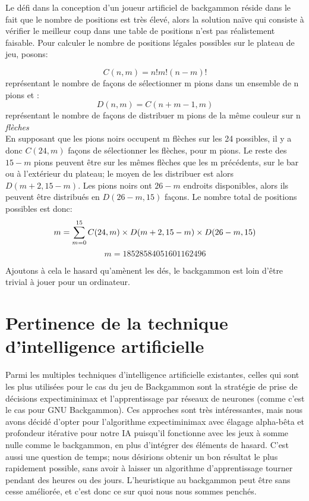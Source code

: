 \documentclass{article}
\begin{document}
Le défi dans la conception d’un joueur artificiel de backgammon réside dans le
fait que le nombre de positions est très élevé, alors la solution naïve qui
consiste à vérifier le meilleur coup dans une table de positions n’est pas
réalistement faisable. Pour calculer le nombre de positions légales possibles
sur le plateau de jeu, posons:


\begin{equation}
    C(n,m) = n!m!(n-m)!
\end{equation}
représentant le nombre de façons de sélectionner m pions dans un ensemble de n
pions et :
\begin{equation}
    D(n,m) = C(n+m-1,m)
\end{equation}
représentant le nombre de façons de distribuer m pions de la même couleur sur n
\emph{flèches}\\

En supposant que les pions noirs occupent m flèches sur les 24 possibles, il y a
donc $ C(24,m) $ façons de sélectionner les flèches, pour m pions. Le reste des
$ 15-m $ pions peuvent être sur les mêmes flèches que les m précédents, sur le bar ou à
l’extérieur du plateau; le moyen de les distribuer est alors $ D(m+2,15-m) $. Les
pions noirs ont $ 26-m $ endroits disponibles, alors ils peuvent être distribués en
$ D(26-m,15) $ façons. Le nombre total de positions possibles est donc:
\begin{equation}
    m = \sum_{m=0}^{15}C(24,m) \times D(m+2, 15-m) \times D(26-m,15)\\
\end{equation}
\begin{equation}
    m = 18 528 584 051 601 162 496
\end{equation}

Ajoutons à cela le hasard qu’amènent les dés, le backgammon est loin d’être
trivial à jouer pour un ordinateur.

\section{Pertinence de la technique d'intelligence artificielle}
Parmi les multiples techniques d’intelligence artificielle existantes, celles
qui sont les plus utilisées pour le cas du jeu de Backgammon sont la stratégie
de prise de décisions expectiminimax et l’apprentissage par réseaux de neurones
(comme c’est le cas pour GNU Backgammon). Ces approches sont très intéressantes,
mais nous avons décidé d’opter pour l’algorithme expectiminimax avec élagage
alpha-bêta et profondeur itérative pour notre IA puisqu’il fonctionne avec les
jeux à somme nulle comme le backgammon, en plus d’intégrer des éléments de
hasard. C’est aussi une question de temps; nous désirions obtenir un bon
résultat le plus rapidement possible, sans avoir à laisser un algorithme
d’apprentissage tourner pendant des heures ou des jours. L’heuristique au
backgammon peut être sans cesse améliorée, et c’est donc ce sur quoi nous nous
sommes penchés. 
\end{document}
